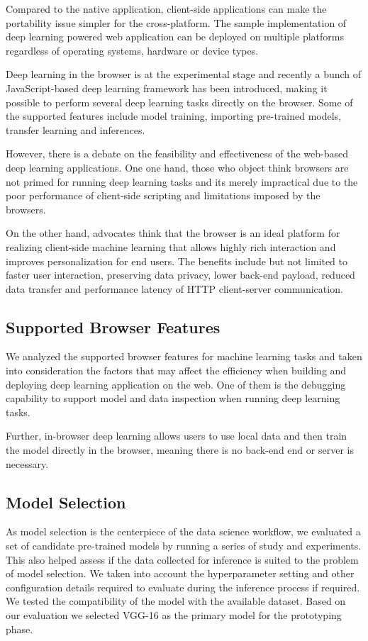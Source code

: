 Compared to the native application, client-side applications can make the portability issue simpler for the cross-platform. The sample implementation of deep learning powered web application can be deployed on multiple platforms regardless of operating systems, hardware or device types.

Deep learning in the browser is at the experimental stage and recently a bunch of JavaScript-based deep learning framework has been introduced, making it possible to perform several deep learning tasks directly on the browser. Some of the supported features include model training, importing pre-trained models, transfer learning and inferences.

However, there is a debate on the feasibility and effectiveness of the web-based deep learning applications. One one hand, those who object think browsers are not primed for running deep learning tasks and its merely impractical due to the poor performance of client-side scripting and limitations imposed by the browsers. 

On the other hand, advocates think that the browser is an ideal platform for realizing client-side machine learning that allows highly rich interaction and improves personalization for end users. The benefits include but not limited to faster user interaction, preserving data privacy, lower back-end payload, reduced data transfer and performance latency of HTTP client-server communication.

\subsection{Supported Browser Features}
We analyzed the supported browser features for machine learning tasks and taken into consideration the factors that may affect the efficiency when building and deploying deep learning application on the web. One of them is the debugging capability to support model and data inspection when running deep learning tasks.

Further, in-browser deep learning allows users to use local data and then train the model directly in the browser, meaning there is no back-end end or server is necessary. 

\subsection{Model Selection}

As model selection is the centerpiece of the data science workflow, we evaluated a set of candidate pre-trained models by running a series of study and experiments. This also helped assess if the data collected for inference is suited to the problem of model selection. We taken into account the hyperparameter setting and other configuration details required to evaluate during the inference process if required. We tested the compatibility of the model with the available dataset. Based on our evaluation we selected VGG-16 as the primary model for the prototyping phase.

